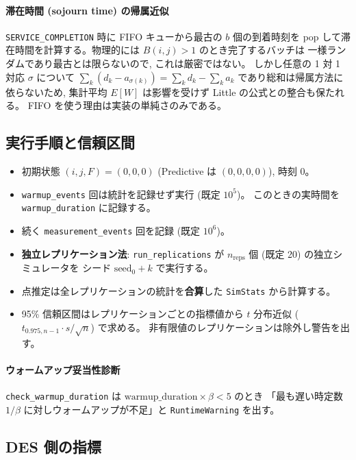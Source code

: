 \documentclass[a4paper,11pt]{article}
\newcommand{\code}[1]{\texttt{#1}}
\begin{document}
\paragraph{滞在時間 (sojourn time) の帰属近似}
\code{SERVICE\_COMPLETION} 時に FIFO キューから最古の $b$ 個の到着時刻を
pop して滞在時間を計算する。物理的には $B(i,j)>1$ のとき完了するバッチは
一様ランダムであり最古とは限らないので, これは厳密ではない。
しかし任意の 1 対 1 対応 $\sigma$ について
$\sum_k(d_k-a_{\sigma(k)})=\sum_k d_k-\sum_k a_k$ であり総和は帰属方法に
依らないため, 集計平均 $E[W]$ は影響を受けず Little の公式との整合も保たれる。
FIFO を使う理由は実装の単純さのみである。

\subsection{実行手順と信頼区間}

\begin{itemize}
  \item 初期状態 $(i,j,F)=(0,0,0)$ (Predictive は $(0,0,0,0)$), 時刻 $0$。
  \item \code{warmup\_events} 回は統計を記録せず実行 (既定 $10^5$)。
        このときの実時間を \code{warmup\_duration} に記録する。
  \item 続く \code{measurement\_events} 回を記録 (既定 $10^6$)。
  \item \textbf{独立レプリケーション法}: \code{run\_replications} が
        $n_{\mathrm{reps}}$ 個 (既定 20) の独立シミュレータを
        シード $\mathrm{seed}_0+k$ で実行する。
  \item 点推定は全レプリケーションの統計を\textbf{合算}した
        \code{SimStats} から計算する。
  \item 95\% 信頼区間はレプリケーションごとの指標値から
        $t$ 分布近似 ($t_{0.975,n-1}\cdot s/\sqrt{n}$) で求める。
        非有限値のレプリケーションは除外し警告を出す。
\end{itemize}

\paragraph{ウォームアップ妥当性診断}
\code{check\_warmup\_duration} は
$\mathrm{warmup\_duration}\times\beta<5$ のとき
「最も遅い時定数 $1/\beta$ に対しウォームアップが不足」と
\code{RuntimeWarning} を出す。

\subsection{DES 側の指標}
\end{document}
